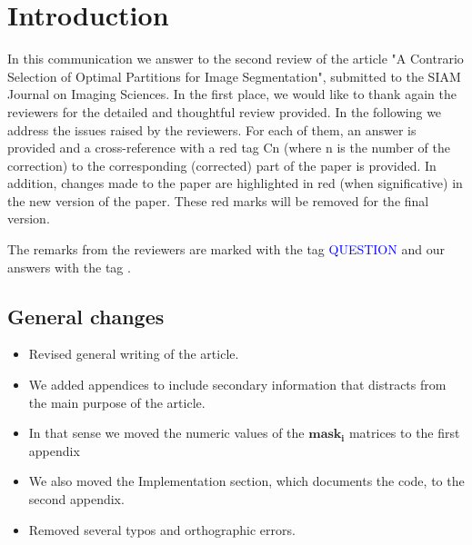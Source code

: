 \documentclass[a4paper,10pt]{report}
\title{}
\author{}
\begin{document}
\maketitle


\chapter{Introduction}
In this communication we answer to the second review of the article "A Contrario Selection of Optimal Partitions for Image Segmentation", submitted to the SIAM Journal on Imaging Sciences.
In the first place, we would like to thank again the reviewers for the detailed and thoughtful review provided. In the following we address the issues raised by the reviewers. 
For each of them, an answer is provided and a cross-reference with a red tag Cn (where n is the number of the correction) to the corresponding (corrected) part of the paper is provided. In addition, changes made to the paper are highlighted in red (when significative) in the new version of the paper. 
These red marks will be removed for the final version.

The remarks from the reviewers are marked with the tag \textcolor{blue}{QUESTION} and our answers with the tag \ans.

\section{General changes}
\begin{itemize}
 \item Revised general writing of the article.
\item We added appendices to include secondary information that distracts from the main purpose of the article.
\item In that sense we moved the numeric values of the $\mathbf{mask_i}$ matrices to the first appendix
\item We also moved the Implementation section, which documents the code, to the second appendix.
\item Removed several typos and orthographic errors.
\end{itemize}
\end{document}
